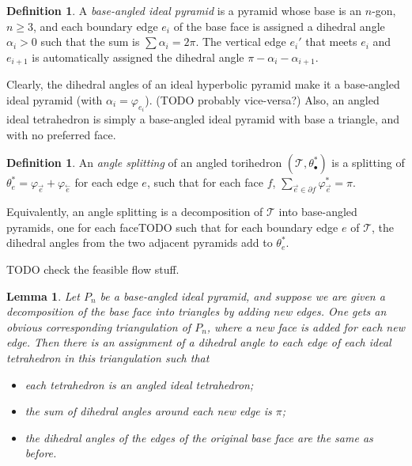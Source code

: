 \documentclass[11pt]{amsart}
\newcommand{\sT}{{\mathcal{T}}}
\newcommand{\cev}[1]{\overset{\leftarrow}{#1}}
\newcommand{\del}{\partial}
\newcommand{\vphi}{\varphi}
\theoremstyle{plain}
\newtheorem{lemma}[theorem]{Lemma}
\theoremstyle{definition}
\newtheorem{define}[theorem]{Definition}
\newtheorem{definition}[theorem]{Definition}
\begin{document}
\begin{define}
A \emph{base-angled ideal pyramid}
is a pyramid whose base is an $n$-gon, $n \geq 3$,
and each boundary edge $e_i$ of the base face is assigned a dihedral angle
$\alpha_i > 0$ such that the sum is $\sum \alpha_i = 2\pi$.
The vertical edge $e_i'$ that meets $e_i$ and $e_{i+1}$
is automatically assigned the dihedral angle $\pi - \alpha_i - \alpha_{i+1}$.
\end{define}

Clearly, the dihedral angles of an ideal hyperbolic pyramid
make it a base-angled ideal pyramid
(with $\alpha_i = \vphi_{e_i}$).
(TODO probably vice-versa?)
Also, an angled ideal tetrahedron is simply a base-angled ideal pyramid
with base a triangle, and with no preferred face.

\begin{definition}
An \emph{angle splitting} of an angled torihedron $(\sT,\theta_\bullet^*)$
is a splitting of $\theta_e^* = \vphi_{\vec{e}} + \vphi_{\cev{e}}$
for each edge $e$,
such that for each face $f$,
$\sum_{\vec{e} \in \del f} \vphi_{\vec{e}}^* = \pi$.

Equivalently, an angle splitting is a decomposition of
$\sT$ into base-angled pyramids,
one for each faceTODO such that
for each boundary edge $e$ of $\sT$,
the dihedral angles from the two adjacent pyramids
add to $\theta_e^*$.
\end{definition}


TODO check the feasible flow stuff.


\begin{lemma}
Let $P_n$ be a base-angled ideal pyramid, and suppose we are given a
decomposition of the base face into triangles by adding new edges.  One gets an
obvious corresponding triangulation of $P_n$, where a new face is added for each
new edge. Then there is an assignment of a dihedral angle to each edge of each
ideal tetrahedron in this triangulation such that
\begin{itemize}
\item each tetrahedron is an angled ideal tetrahedron;
\item the sum of dihedral angles around each new edge is $\pi$;
\item the dihedral angles of the edges of the original base face are the same as
	before.
\end{itemize} 
\end{lemma}
\end{document}
